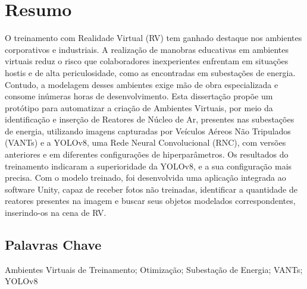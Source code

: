 \newpage
\thispagestyle{empty}
\chapter*{Resumo}
\vspace{-35pt}

O treinamento com Realidade Virtual (RV) tem ganhado destaque nos ambientes corporativos e industriais. A realização de manobras educativas em ambientes virtuais reduz o risco que colaboradores inexperientes enfrentam em situações hostis e de alta periculosidade, como as encontradas em subestações de energia. Contudo, a modelagem desses ambientes exige mão de obra especializada e consome inúmeras horas de desenvolvimento. Esta dissertação propõe um protótipo para automatizar a criação de Ambientes Virtuais, por meio da identificação e inserção de Reatores de Núcleo de Ar, presentes nas subestações de energia, utilizando imagens capturadas por Veículos Aéreos Não Tripulados (VANTs) e a YOLOv8, uma Rede Neural Convolucional (RNC), com versões anteriores e em diferentes configurações de hiperparâmetros. Os resultados do treinamento indicaram a superioridade da YOLOv8, e a sua configuração mais precisa. Com o modelo treinado, foi desenvolvida uma aplicação integrada ao software Unity, capaz de receber fotos não treinadas, identificar a quantidade de reatores presentes na imagem e buscar seus objetos modelados correspondentes, inserindo-os na cena de RV.

\section*{Palavras Chave}
Ambientes Virtuais de Treinamento; Otimização; Subestação de Energia; VANTs; YOLOv8
\newpage



